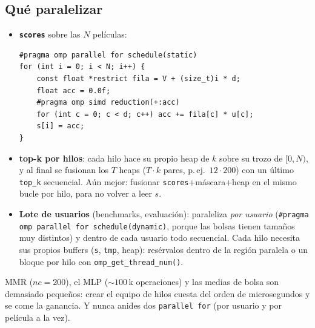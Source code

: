 \documentclass[a4paper,11pt]{article}
\newcommand{\cod}[1]{\texttt{#1}}
\begin{document}
\subsection{Qué paralelizar}
\begin{itemize}
  \item \textbf{\texttt{scores}} sobre las $N$ películas:
\begin{lstlisting}[style=c]
#pragma omp parallel for schedule(static)
for (int i = 0; i < N; i++) {
    const float *restrict fila = V + (size_t)i * d;
    float acc = 0.0f;
    #pragma omp simd reduction(+:acc)
    for (int c = 0; c < d; c++) acc += fila[c] * u[c];
    s[i] = acc;
}
\end{lstlisting}
  \item \textbf{top-k por hilos}: cada hilo hace su propio heap de $k$ sobre su trozo de $[0, N)$, y al final se
        fusionan los $T$ heaps ($T\cdot k$ pares, p.\,ej.\ $12\cdot200$) con un último \cod{top\_k} secuencial. Aún mejor:
        fusionar \cod{scores}+máscara+heap en el mismo bucle por hilo, para no volver a leer $s$.
  \item \textbf{Lote de usuarios} (benchmarks, evaluación): paraleliza \emph{por usuario}
        (\cod{\#pragma omp parallel for schedule(dynamic)}, porque las bolsas tienen tamaños muy distintos) y dentro de
        cada usuario todo secuencial. Cada hilo necesita sus propios buffers (\cod{s}, \cod{tmp}, heap): resérvalos
        dentro de la región paralela o un bloque por hilo con \cod{omp\_get\_thread\_num()}.
\end{itemize}

\begin{ojo}
MMR ($nc = 200$), el MLP ($\sim 100$\,k operaciones) y las medias de bolsa son demasiado pequeños: crear el equipo de
hilos cuesta del orden de microsegundos y se come la ganancia. Y nunca anides dos \cod{parallel for} (por usuario y
por película a la vez).
\end{ojo}
\end{document}
